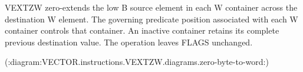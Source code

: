 VEXTZW zero-extends the low B source element in each W container across the
destination W element.  The governing predicate position associated with each W
container controls that container.  An inactive container retains its complete
previous destination value.  The operation leaves FLAGS unchanged.

(:diagram:VECTOR.instructions.VEXTZW.diagrams.zero-byte-to-word:)

